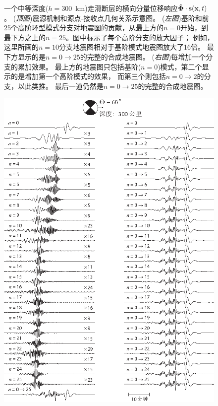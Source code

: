 \begin{figure}
\begin{center}
{}
\end{center}
\caption[overtonesL]{
\label{fig:15.overtonesL}
一个中等深度($h=300$~km)走滑断层的横向分量位移响应$\hat{\bf \Phi}\cdot{\bf s}({\bf x},t)$。
({\em 顶图\/})震源机制和源点-接收点几何关系示意图。
({\em 左图\/})基阶和前25个高阶环型模式分支对地震图的贡献，从最上方的$n=0$开始，到最下方之上的$n=25$。图中标示了每个高阶分支的放大因子；
例如，这里所画的$n = 10$分支地震图相对于基阶模式地震图放大了16倍。
最下方显示的是$n=0\!\rightarrow\!25$的完整的合成地震图。 
({\em 右图\/})每增加一个分支的累加效果。
最上方的地震图只包括基阶($n=0$)模式，第二个显示的是增加第一个高阶模式的效果，
而第三个则包括$n=0\!\rightarrow\!2$的分支，以此类推。
最后一道仍然是$n=0\!\rightarrow\!25$的完整的合成地震图。
}
\end{figure}
\begin{figure}
\begin{center}
\scalebox{0.95}
{
\includegraphics{../figures/chap11/fig16.eps}
}
\end{center}
\end{figure}
